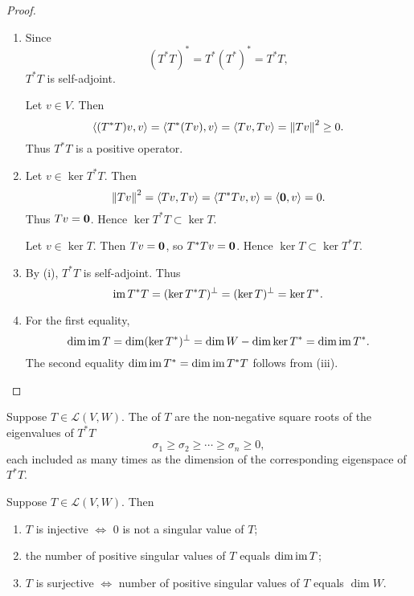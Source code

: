 \begin{proof} \
\begin{enumerate}[label=(\roman*)]
\item Since
\[(T^*T)^*=T^*(T^*)^*=T^*T,\]
$T^*T$ is self-adjoint. 

Let $v\in V$. Then
\[\left\langle(T^*T)v,v\right\rangle=\left\langle T^*(Tv),v\right\rangle=\left\langle Tv,Tv\right\rangle=\norm{Tv}^2\ge0.\]
Thus $T^*T$ is a positive operator.

\item \fbox{$\subset$} Let $v\in\ker T^*T$. Then 
\[\norm{Tv}^2=\left\langle Tv,Tv\right\rangle=\left\langle T^*Tv,v\right\rangle=\left\langle\vb{0},v\right\rangle=0.\]
Thus $Tv=\vb{0}$. Hence $\ker T^*T\subset\ker T$.

\fbox{$\supset$} Let $v\in\ker T$. Then $Tv=\vb{0}$, so $T^*Tv=\vb{0}$. Hence $\ker T\subset\ker T^*T$.

\item By (i), $T^*T$ is self-adjoint. Thus
\[\operatorname{im} T^*T=(\ker T^*T)^\perp=(\ker T)^\perp=\ker T^*.\]

\item For the first equality, 
\[\dim\operatorname{im} T=\dim(\ker T^*)^\perp=\dim W-\dim\ker T^*=\dim\operatorname{im} T^*.\]
The second equality $\dim\operatorname{im} T^*=\dim\operatorname{im} T^*T$ follows from (iii).
\end{enumerate}
\end{proof}

\begin{definition}
Suppose $T\in\mathcal{L}(V,W)$. The  of $T$ are the non-negative square roots of the eigenvalues of $T^*T$
\[\sigma_1\ge\sigma_2\ge\cdots\ge\sigma_n\ge0,\]
each included as many times as the dimension of the corresponding eigenspace of $T^*T$.
\end{definition}

\begin{lemma}
Suppose $T\in\mathcal{L}(V,W)$. Then
\begin{enumerate}[label=(\roman*)]
\item $T$ is injective $\iff$ $0$ is not a singular value of $T$;
\item the number of positive singular values of $T$ equals $\dim\operatorname{im} T$;
\item $T$ is surjective $\iff$ number of positive singular values of $T$ equals $\dim W$.
\end{enumerate}
\end{lemma}

